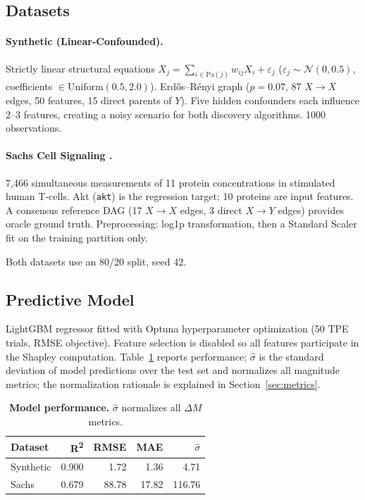 \documentclass[12pt,letterpaper,twocolumn]{article}
\begin{document}
\subsection{Datasets}

\paragraph{Synthetic (Linear-Confounded).}
Strictly linear structural equations $X_j = \sum_{i \in \mathrm{Pa}(j)} w_{ij} X_i +
\varepsilon_j$ ($\varepsilon_j \sim \mathcal{N}(0, 0.5)$, coefficients $\in
\mathrm{Uniform}(0.5, 2.0)$). Erd\H{o}s--R\'{e}nyi graph ($p = 0.07$, 87 $X \to X$
edges, 50 features, 15 direct parents of $Y$). Five hidden confounders each influence
2--3 features, creating a noisy scenario for both discovery algorithms. 1000 observations.

\paragraph{Sachs Cell Signaling \citep{Sachs2005}.}
7,466 simultaneous measurements of 11 protein concentrations in stimulated human
T-cells. Akt (\texttt{akt}) is the regression target; 10 proteins are input features.
A consensus reference DAG (17 $X \to X$ edges, 3 direct $X \to Y$ edges) provides
oracle ground truth. Preprocessing: log1p transformation, then a Standard Scaler fit
on the training partition only. 

Both datasets use an 80/20 split, seed 42.

\subsection{Predictive Model}

LightGBM regressor fitted with Optuna hyperparameter optimization (50 TPE trials,
RMSE objective). Feature selection is disabled so all features participate in the
Shapley computation. Table~\ref{tab:model_performance} reports performance; $\hat{\sigma}$
is the standard deviation of model predictions over the test set and normalizes all
magnitude metrics; the normalization rationale is explained in Section~\ref{sec:metrics}.

\begin{table}[t]
  \centering
  \footnotesize
  \caption{\textbf{Model performance.} $\hat{\sigma}$ normalizes all $\Delta M$ metrics.}
  \label{tab:model_performance}
  \begin{tabular}{lrrrr}
    \toprule
    \textbf{Dataset} & \textbf{R\textsuperscript{2}} & \textbf{RMSE} & \textbf{MAE} & $\hat{\sigma}$ \\
    \midrule
    Synthetic & 0.900 & 1.72  & 1.36  & 4.71  \\
    Sachs     & 0.679 & 88.78 & 17.82 & 116.76  \\
    \bottomrule
  \end{tabular}
\end{table}
\end{document}
